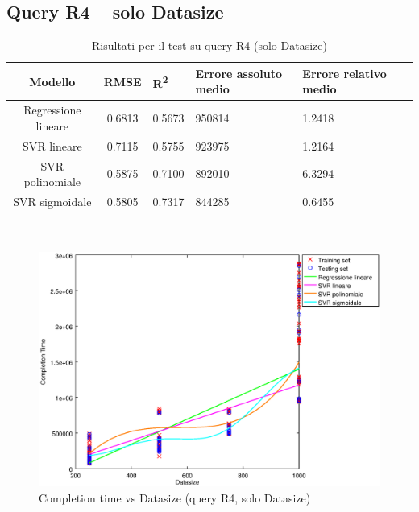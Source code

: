 \documentclass[a4paper,11pt]{article}
\begin{document}
\subsection{Query R4 -- solo Datasize}
\begin{table}[bhpt]
	\centering
	\begin{adjustbox}{center}
		\begin{tabular}{c | c M{1cm} M{2.5cm} M{2.5cm} M{1.8cm}}
			Modello & RMSE & R\textsuperscript{2} & Errore assoluto medio & Errore relativo medio \tabularnewline
			\hline
			Regressione lineare & 0.6813 & 0.5673 & 950814 & 1.2418 \\
			SVR lineare & 0.7115 & 0.5755 & 923975 & 1.2164 \\
			SVR polinomiale & 0.5875 & 0.7100 & 892010 & 6.3294 \\
			SVR sigmoidale & 0.5805 & 0.7317 & 844285 & 0.6455 \\
		\end{tabular}
	\end{adjustbox}
	\\
	\caption{Risultati per il test su query R4 (solo Datasize)}
	\label{table_R4_datasize}
\end{table}

\begin {figure}[hbtp]
\centering
\includegraphics[width=\textwidth]{output/R4_SOLO_DATASIZE/plot_R4.eps}
\caption {Completion time vs Datasize (query R4, solo Datasize)}
\end {figure}

\newpage
\end{document}
